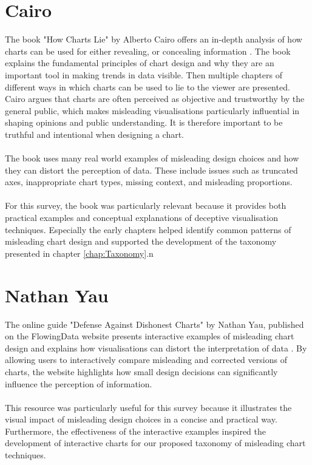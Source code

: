 \section{Cairo}
The book "How Charts Lie" by Alberto Cairo offers an in-depth analysis of how charts can be used for either revealing, or concealing information \cite{cairo2019}. The book explains the fundamental principles of chart design and why they are an important tool in making trends in data visible. Then multiple chapters of different ways in which charts can be used to lie to the viewer are presented. Cairo argues that charts are often perceived as objective and trustworthy by the general public, which makes misleading visualisations particularly influential in shaping opinions and public understanding. It is therefore important to be truthful and intentional when designing a chart.
\\\\
The book uses many real world examples of misleading design choices and how they can distort the perception of data. These include issues such as truncated axes, inappropriate chart types, missing context, and misleading proportions. 
\\\\
For this survey, the book was particularly relevant because it provides both practical examples and conceptual explanations of deceptive visualisation techniques. Especially the early chapters helped identify common patterns of misleading chart design and supported the development of the taxonomy presented in chapter \ref{chap:Taxonomy}.n

 
\section{Nathan Yau}
The online guide "Defense Against Dishonest Charts" by Nathan Yau, published on the FlowingData website presents interactive examples of misleading chart design and explains how visualisations can distort the interpretation of data \cite{Yau2025}. By allowing users to interactively compare misleading and corrected versions of charts, the website highlights how small design decisions can significantly influence the perception of information.
\\\\
This resource was particularly useful for this survey because it illustrates the visual impact of misleading design choices in a concise and practical way. Furthermore, the effectiveness of the interactive examples inspired the development of interactive charts for our proposed taxonomy of misleading chart techniques.


